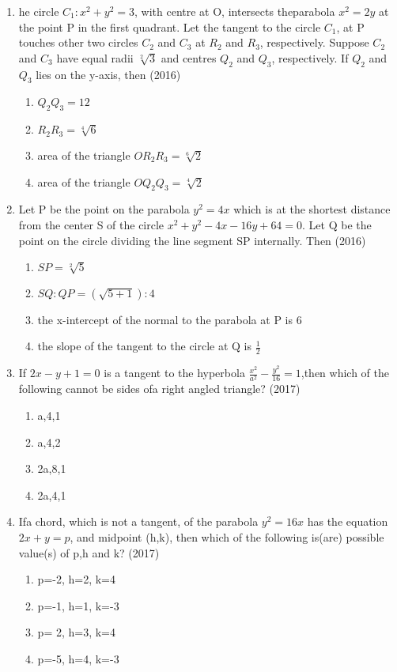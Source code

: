 \documentclass[12pt]{article}
\begin{document}
\begin{enumerate}
\item he circle $C_1:x^2+y^2=3$, with centre at O, intersects theparabola $x^2=2y$ at the point P in the first quadrant. Let the tangent to the circle $C_1$, at P touches other two circles $C_2$ and $C_3$ at $R_2$ and $R_3$, respectively. Suppose $C_2$ and $C_3$ have equal radii $\sqrt[2]{3}$ and centres $Q_2$ and $Q_3$, respectively. If $Q_2$ and $Q_3$ lies on the y-axis, then (2016)
\begin{enumerate}
\item $Q_2Q_3=12$
\item $R_2R_3=\sqrt[4]{6}$
\item area of the triangle $OR_2R_3=\sqrt[6]{2}$
\item area of the triangle $OQ_2Q_3=\sqrt[4]{2}$
\end{enumerate}
\item Let P be the point on the parabola $y^2=4x$ which is at the shortest distance from the center S of the circle $x^2+y^2-4x-16y+64=0$. Let Q be the point on the circle dividing the line segment SP internally. Then (2016)
\begin{enumerate}
\item $SP=\sqrt[2]{5}$
\item $SQ:QP=(\sqrt{5+1}):4$
\item the x-intercept of the normal to the parabola at P is 6
\item the slope of the tangent to the circle at Q is $\frac{1}{2}$
\end{enumerate}
\item If $2x-y+1=0$ is a tangent to the hyperbola $\frac{x^2}{a^2}-\frac{y^2}{16}=1$,then which of the following cannot be sides ofa right angled
triangle? (2017)
\begin{enumerate}
\item a,4,1
\item a,4,2
\item 2a,8,1
\item 2a,4,1
\end{enumerate}
\item Ifa chord, which is not a tangent, of the parabola $y^2=16x$ has the equation $2x+y=p$, and midpoint (h,k), then which of the following is(are) possible value(s) of p,h and k? (2017)
\begin{enumerate}
\item p=-2, h=2, k=4
\item p=-1, h=1, k=-3
\item p= 2, h=3, k=4
\item p=-5, h=4, k=-3

\end{enumerate}
\end{enumerate}
\end{document}
